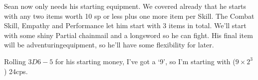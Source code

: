   \begin{exampletext}

    Sean now only needs his starting equipment.
    We covered already that he starts with any two items worth 10 \gls{sp} or less plus one more item per Skill.
    The Combat Skill, Empathy and Performance let him start with 3 items in total.
    We'll start with some shiny Partial chainmail and a longsword so he can fight.
    His final item will be \gls{adventuringequipment}, so he'll have some flexibility for later.

  Rolling $3D6-5$ for his starting money, I've got a `9', so I'm starting with ($9\times 2^3$) 24\glspl{cp}.

\end{exampletext}
